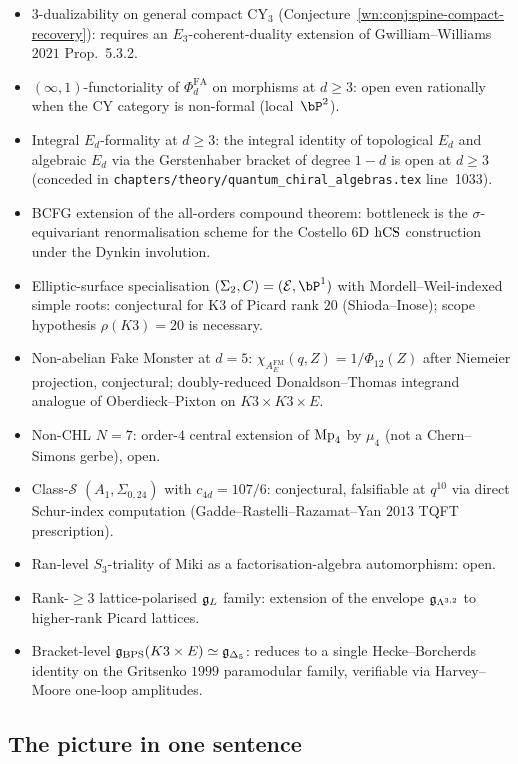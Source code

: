 \begin{itemize}
\item 3-dualizability on general compact CY$_3$
(Conjecture~\ref{wn:conj:spine-compact-recovery}): requires an
$E_3$-coherent-duality extension of Gwilliam--Williams $2021$
Prop.~5.3.2.
\item $(\infty,1)$-functoriality of $\Phi^{\mathrm{FA}}_d$ on morphisms
at $d \geq 3$: open even rationally when the CY
category is non-formal (local~$\bP^2$).
\item Integral $E_d$-formality at $d \geq 3$: the integral identity of
topological $E_d$ and algebraic $E_d$ via the Gerstenhaber bracket of
degree $1-d$ is open at $d \geq 3$ (conceded in
\texttt{chapters/theory/quantum\_chiral\_algebras.tex} line~1033).
\item BCFG extension of the all-orders compound theorem: bottleneck is
the $\sigma$-equivariant renormalisation scheme for the Costello 6D
$\mathrm{hCS}$ construction under the Dynkin involution.
\item Elliptic-surface specialisation $(\Sigma_2, C) = (\mathcal{E},
\bP^1)$ with Mordell--Weil-indexed simple roots: conjectural for K3 of
Picard rank $20$ (Shioda--Inose); scope hypothesis
$\rho(K3) = 20$ is necessary.
\item Non-abelian Fake Monster at $d = 5$:
$\chi_{A^{\mathrm{FM}}_E}(q, Z) = 1/\Phi_{12}(Z)$ after Niemeier
projection, conjectural; doubly-reduced Donaldson--Thomas integrand
analogue of Oberdieck--Pixton on $K3\times K3\times E$.
\item Non-CHL $N = 7$: order-$4$ central extension of $\mathrm{Mp}_4$ by
$\mu_4$ (not a Chern--Simons gerbe), open.
\item Class-$\mathcal{S}$ $(A_1, \Sigma_{0,24})$ with $c_{4d} = 107/6$:
conjectural, falsifiable at $q^{10}$ via direct Schur-index
computation (Gadde--Rastelli--Razamat--Yan $2013$ TQFT prescription).
\item Ran-level $S_3$-triality of Miki as a factorisation-algebra
automorphism: open.
\item Rank-$\geq 3$ lattice-polarised $\mathfrak{g}_L$ family: extension of the
envelope $\mathfrak{g}_{\Lambda^{3,2}}$ to higher-rank Picard lattices.
\item Bracket-level $\mathfrak{g}_{\mathrm{BPS}}(K3 \times E) \simeq
\mathfrak{g}_{\Delta_5}$: reduces to a single Hecke--Borcherds identity on the
Gritsenko $1999$ paramodular family, verifiable via Harvey--Moore
one-loop amplitudes.
\end{itemize}

\subsection{The picture in one sentence}
\label{wn:subsec:spine-one-line}

